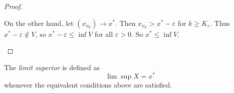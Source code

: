 \begin{proof}
\begin{itemize}
		On the other hand, let $(x_{n_k}) \to x^*$. Then $x_{n_k}>x^* - \varepsilon$ for $k \ge K_\varepsilon$. Thus $x^* - \varepsilon \not\in V$, so $x^* - \varepsilon \le  \operatorname{inf} V$ for all $\varepsilon>0$. So $x^* \le \operatorname{inf} V$.
	\end{itemize}
\end{proof}



\begin{definition}
	The \textit{limit superior} is defined as 
	\[
		\lim \sup X = x^*
	\] 
	whenever the equivalent conditions above are satisfied.
\end{definition}
